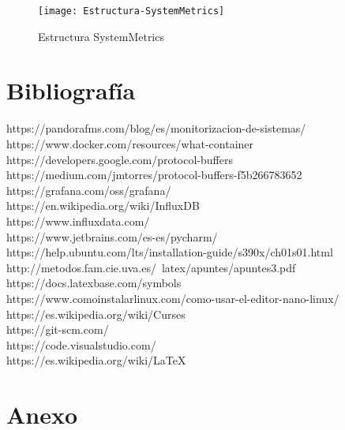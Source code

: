 \documentclass[ spanish, a4paper, 12pt, oneside]{report}
\begin{document}
\begin{figure}[!h]
   \centering
   \texttt{[image: Estructura-SystemMetrics]}\\
      \caption{\label{fig: Estructura SystemMetrics} Estructura SystemMetrics}
\end{figure}

\chapter{Bibliografía}
https://pandorafms.com/blog/es/monitorizacion-de-sistemas/ \\
https://www.docker.com/resources/what-container \\
https://developers.google.com/protocol-buffers \\
https://medium.com/jmtorres/protocol-buffers-f5b266783652 \\
https://grafana.com/oss/grafana/ \\
https://en.wikipedia.org/wiki/InfluxDB \\
https://www.influxdata.com/ \\
https://www.jetbrains.com/es-es/pycharm/ \\
https://help.ubuntu.com/lts/installation-guide/s390x/ch01s01.html \\
http://metodos.fam.cie.uva.es/~latex/apuntes/apuntes3.pdf \\
https://docs.latexbase.com/symbols \\
https://www.comoinstalarlinux.com/como-usar-el-editor-nano-linux/\\
https://es.wikipedia.org/wiki/Curses \\
https://git-scm.com/ \\
https://code.visualstudio.com/ \\
https://es.wikipedia.org/wiki/LaTeX \\

\chapter{Anexo}
\listoffigures
\end{document}
